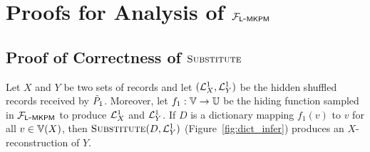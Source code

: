 \section{Proofs for Analysis of $\mathcal{F}_{\mathsf{L\mbox{-}MKPM}}$}

\subsection{Proof of Correctness of $\textsc{Substitute}$}
\label{sec:dictinfer:correctness}


\begin{lemma}
	\label{lem:dictinfer_MR}
	Let $X$ and $Y$ be two sets of records and let $(\mathcal{L}^{1}_X, \mathcal{L}^{1}_Y)$ be the
        hidden shuffled records received by $\tilde{P}_1$.  Moreover, let
        $f_1: \Ispace{} \to \Uspace$ be the hiding function sampled in
        $\mathcal{F}_{\mathsf{L\mbox{-}MKPM}}$ to produce $\mathcal{L}^{1}_X$ and $\mathcal{L}^{1}_Y$.  If $D$ is a dictionary
        mapping $f_1(v)$ to $v$ for all $v \in \Ispace[X]$, then
        $\textsc{Substitute}(D, \mathcal{L}^{1}_Y)$ (Figure~\ref{fig:dict_infer}) produces an
        $X$-reconstruction of $Y$.
\end{lemma}
